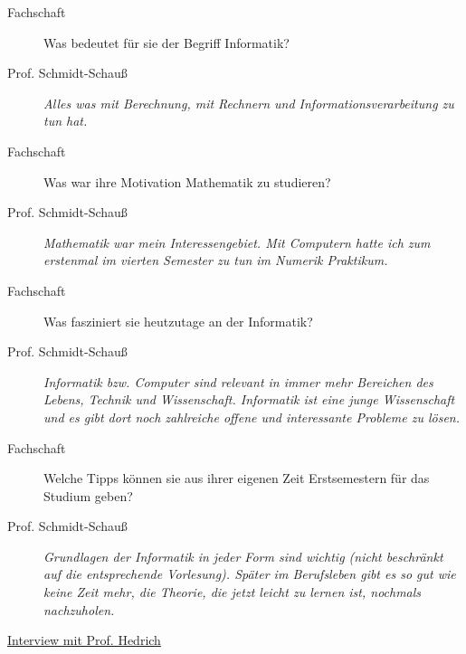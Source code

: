 \begin{description}

\item[Fachschaft] 

Was bedeutet für sie der Begriff Informatik?

\item[Prof. Schmidt-Schauß]
 
\textit{Alles was mit  Berechnung, mit Rechnern und Informationsverarbeitung zu tun hat.}

\item[Fachschaft]

Was war ihre Motivation Mathematik zu studieren?

\item[Prof. Schmidt-Schauß]

\textit{Mathematik war mein Interessengebiet. Mit Computern hatte ich zum erstenmal im vierten Semester zu tun im Numerik Praktikum.}

\item[Fachschaft]

Was fasziniert sie heutzutage an der Informatik?

\item[Prof. Schmidt-Schauß]

\textit{Informatik bzw. Computer sind relevant in immer mehr Bereichen des Lebens, Technik und Wissenschaft.
Informatik ist eine junge Wissenschaft und es gibt dort noch zahlreiche offene und interessante Probleme zu lösen.}

\item[Fachschaft]

Welche Tipps können sie aus ihrer eigenen Zeit Erstsemestern für das Studium geben?

\item[Prof. Schmidt-Schauß]

\textit{Grundlagen der Informatik in jeder Form sind wichtig (nicht beschränkt auf die entsprechende Vorlesung). Später im Berufsleben gibt es so gut wie keine Zeit mehr, die Theorie, die jetzt leicht zu lernen ist, nochmals nachzuholen.}

\end{description}


\begin{flushleft}\underline{Interview mit Prof. Hedrich} \end{flushleft}

